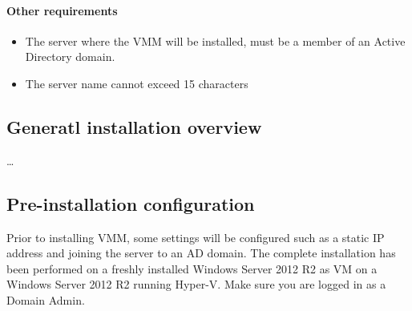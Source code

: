 \paragraph{Other requirements}
\begin{itemize}
\item The server where the VMM will be installed, must be a member of an Active Directory domain.
\item The server name cannot exceed 15 characters
\end{itemize}
\subsection{Generatl installation overview}
\ldots
\subsection{Pre-installation configuration}
Prior to installing VMM, some settings will be configured such as a static IP address and joining the server to an AD domain. The complete installation has been performed on a freshly installed Windows Server 2012 R2 as VM on a Windows Server 2012 R2 running Hyper-V. Make sure you are logged in as a Domain Admin.

